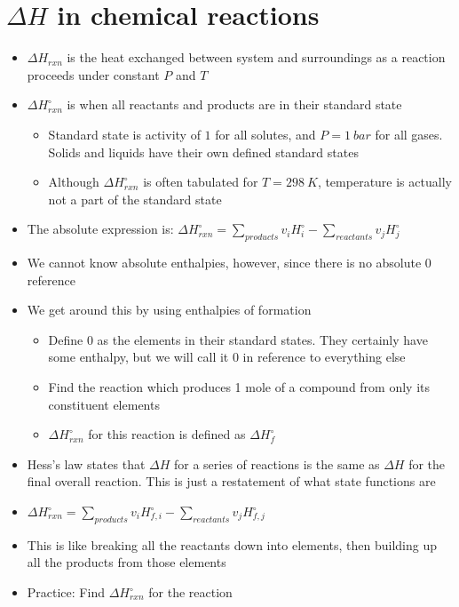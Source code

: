 \documentclass[12pt, openany, letterpaper]{memoir}
\begin{document}
\section*{$\Delta H$ in chemical reactions}
\begin{itemize}
	\item $\Delta H_{rxn}$ is the heat exchanged between system and surroundings as a reaction proceeds under constant $P$ and $T$
	\item $\Delta H_{rxn}^{\circ}$ is when all reactants and products are in their standard state
	\begin{itemize}
		\item Standard state is activity of $1$ for all solutes, and $P=1~bar$ for all gases. Solids and liquids have their own defined standard states
		\item Although $\Delta H_{rxn}^{\circ}$ is often tabulated for $T=298~K$, temperature is actually not a part of the standard state
	\end{itemize}
	\item The absolute expression is: $\Delta H_{rxn}^{\circ} = \sum\limits_{products} v_iH_i^{\circ} - \sum\limits_{reactants}v_jH_j^\circ$
	\item We cannot know absolute enthalpies, however, since there is no absolute $0$ reference
	\item We get around this by using enthalpies of formation
	\begin{itemize}
		\item Define $0$ as the elements in their standard states. They certainly have some enthalpy, but we will call it $0$ in reference to everything else
		\item Find the reaction which produces 1 mole of a compound from only its constituent elements
		\item $\Delta H_{rxn}^{\circ}$ for this reaction is defined as $\Delta H_f^\circ$
	\end{itemize}
	\item Hess's law states that $\Delta H$ for a series of reactions is the same as $\Delta H$ for the final overall reaction. This is just a restatement of what state functions are
	\item $\Delta H_{rxn}^{\circ} = \sum\limits_{products} v_iH_{f,i}^{\circ} - \sum\limits_{reactants}v_jH_{f,j}^\circ$
	\item This is like breaking all the reactants down into elements, then building up all the products from those elements
	\item Practice: Find $\Delta H_{rxn}^{\circ}$ for the reaction 
\end{itemize}
\end{document}
